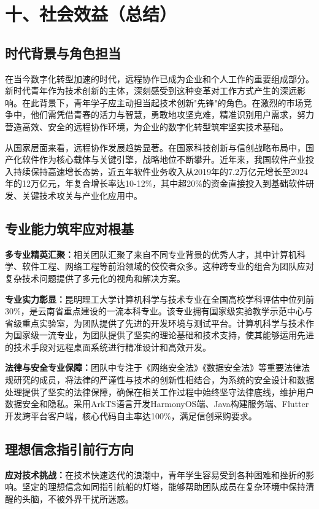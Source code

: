 \documentclass[12pt,a4paper]{article}
\begin{document}
\section{十、社会效益（总结）}

\subsection{时代背景与角色担当}
在当今数字化转型加速的时代，远程协作已成为企业和个人工作的重要组成部分。新时代青年作为技术创新的主体，深刻感受到这种变革对工作方式产生的深远影响。在此背景下，青年学子应主动担当起技术创新"先锋"的角色。在激烈的市场竞争中，他们需凭借青春的活力与智慧，勇敢地攻坚克难，精准识别用户需求，努力营造高效、安全的远程协作环境，为企业的数字化转型筑牢坚实技术基础。

从国家层面来看，远程协作发展趋势显著。在国家科技创新与信创战略布局中，国产化软件作为核心载体与关键引擎，战略地位不断攀升。近年来，我国软件产业投入持续保持高速增长态势，近五年软件业务收入从2019年的7.2万亿元增长至2024年的12万亿元，年复合增长率达10-12\%，其中超20\%的资金直接投入到基础软件研发、关键技术攻关与产业化应用中。

\subsection{专业能力筑牢应对根基}
\textbf{多专业精英汇聚：}相关团队汇聚了来自不同专业背景的优秀人才，其中计算机科学、软件工程、网络工程等前沿领域的佼佼者众多。这种跨专业的组合为团队应对复杂技术问题提供了多元化的视角和解决方案。

\textbf{专业实力彰显：}昆明理工大学计算机科学与技术专业在全国高校学科评估中位列前30\%，是云南省重点建设的一流本科专业。该专业拥有国家级实验教学示范中心与省级重点实验室，为团队提供了先进的开发环境与测试平台。计算机科学与技术作为国家级一流专业，为团队提供了坚实的理论基础和技术支持，使其能够运用先进的技术手段对远程桌面系统进行精准设计和高效开发。

\textbf{法律与安全专业保障：}团队中专注于《网络安全法》《数据安全法》等重要法律法规研究的成员，将法律的严谨性与技术的创新性相结合，为系统的安全设计和数据处理提供了坚实的法律保障，确保在相关工作过程中始终坚守法律底线，维护用户数据安全和隐私。采用ArkTS语言开发HarmonyOS端、Java构建服务端、Flutter开发跨平台客户端，核心代码自主率达100\%，满足信创采购要求。

\subsection{理想信念指引前行方向}
\textbf{应对技术挑战：}在技术快速迭代的浪潮中，青年学生容易受到各种困难和挫折的影响。坚定的理想信念如同指引航船的灯塔，能够帮助团队成员在复杂环境中保持清醒的头脑，不被外界干扰所迷惑。
\end{document}
